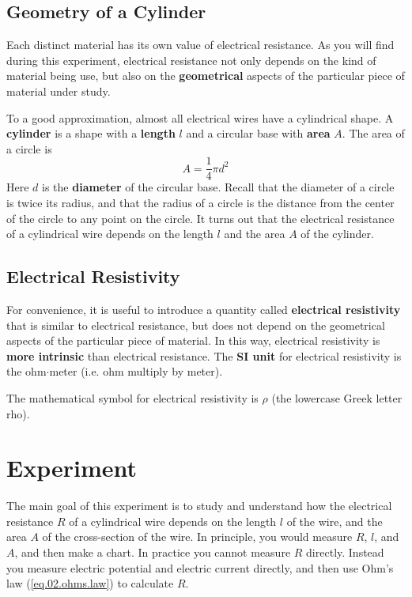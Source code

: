 \subsection{Geometry of a Cylinder}
%
Each distinct material has its own value of electrical resistance. As you will find during this experiment, electrical resistance not only depends on the kind of material being use, but also on the \textbf{geometrical} aspects of the particular piece of material under study.

To a good approximation, almost all electrical wires have a cylindrical shape. A \textbf{cylinder} is a shape with a \textbf{length} $l$ and a circular base with \textbf{area} $A$. The area of a circle is
\begin{equation}
	A = \frac{1}{4} \pi d^{2}
	\label{eq.02.area}
\end{equation}
Here $d$ is the \textbf{diameter} of the circular base. Recall that the diameter of a circle is twice its radius, and that the radius of a circle is the distance from the center of the circle to any point on the circle. It turns out that the electrical resistance of a cylindrical wire depends on the length $l$ and the area $A$ of the cylinder.
%
\subsection{Electrical Resistivity}
%
For convenience, it is useful to introduce a quantity called \textbf{electrical resistivity} that is similar to electrical resistance, but does not depend on the geometrical aspects of the particular piece of material. In this way, electrical resistivity is \textbf{more intrinsic} than electrical resistance. The \textbf{SI unit} for electrical resistivity is the ohm$\cdot$meter (i.e. ohm multiply by meter).

The mathematical symbol for electrical resistivity is $\rho$ (the lowercase Greek letter rho).
%
\section{Experiment}
%
The main goal of this experiment is to study and understand how the electrical resistance $R$ of a cylindrical wire depends on the length $l$ of the wire, and the area $A$ of the cross-section of the wire. In principle, you would measure $R$, $l$, and $A$, and then make a chart. In practice you cannot measure $R$ directly. Instead you measure electric potential and electric current directly, and then use Ohm's law (\ref{eq.02.ohms.law}) to calculate $R$.

